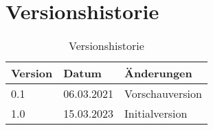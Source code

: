 \section{Versionshistorie}

\begin{table}[ht]
  \centering
  \begin{tabular}{|l|l|l|}
    \hline
    \textbf{Version} & \textbf{Datum} & \textbf{Änderungen} \\ \hline
    0.1              & 06.03.2021     & Vorschauversion     \\ \hline
    1.0              & 15.03.2023     & Initialversion      \\ \hline
  \end{tabular}
  \caption{Versionshistorie}
  \label{tab:versionshistorie}
\end{table}